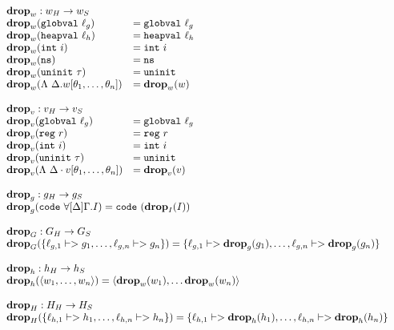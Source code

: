 {\footnotesize
\[\begin{array}{l}
\begin{array}{ll}
\rlap{$\drop{w} : \high w -> \simple{w}$} \\
\drop{w}(\mathtt{globval}\ \ell_g) &= \mathtt{globval}\ \ell_g \\
\drop{w}(\mathtt{heapval}\ \ell_h) &= \mathtt{heapval}\ \ell_h \\
\drop{w}(\mathtt{int}\ i) &= \mathtt{int}\ i \\
\drop{w}(\mathtt{ns}) &= \mathtt{ns} \\
\drop{w}(\mathtt{uninit}\ \tau) &= \mathtt{uninit} \\
\drop{w}(\Lambda\ \Delta.w[\theta_1, \dots, \theta_n]) &= \drop{w}(w) \\\\

\rlap{$\drop{v} : \high v -> \simple{v}$} \\
\drop{v}(\mathtt{globval}\ \ell_g) &= \mathtt{globval}\ \ell_g \\
\drop{v}(\mathtt{reg}\ r) &= \mathtt{reg}\ r \\
\drop{v}(\mathtt{int}\ i) &= \mathtt{int}\ i \\
\drop{v}(\mathtt{uninit}\ \tau) &= \mathtt{uninit} \\
\drop{v}(\Lambda\ \Delta \cdot v[\theta_1, \dots, \theta_n]) &= \drop{v}(v)
\end{array} \\\\

\begin{array}{l}
\drop{g} : \high g -> \simple{g} \\
\drop{g}(\mathtt{code}\ \forall[\Delta]\Gamma.I) = \mathtt{code}\ (\drop{I}(I)) \\\\

\drop{G} : \high G -> \simple{G} \\
\drop{G}(\{\ell_{g,1} |-> g_1, \dots, \ell_{g,n} |-> g_n\}) = \{\ell_{g,1} |-> \drop{g}(g_1), \dots, \ell_{g,n} |-> \drop{g}(g_n)\} \\\\

\drop{h} : \high h -> \simple{h} \\
\drop{h}(\langle w_1, \dots, w_n \rangle) = \langle \drop{w}(w_1), \dots \drop{w}(w_n)\rangle \\\\

\drop{H} : \high H -> \simple{H} \\
\drop{H}(\{\ell_{h,1} |-> h_1, \dots, \ell_{h,n} |-> h_n\}) = \{\ell_{h,1} |-> \drop{h}(h_1), \dots, \ell_{h,n} |-> \drop{h}(h_n)\}
\end{array} \\\\


\end{array}\]}
